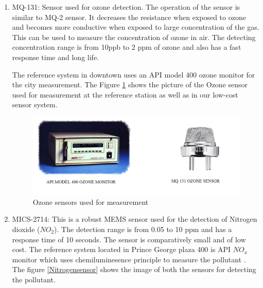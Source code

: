 \begin{enumerate}

\item MQ-131: Sensor used for ozone detection. The operation of the sensor is similar to MQ-2 sensor. It decreases the resistance when exposed to ozone and becomes more conductive when exposed to large concentration of the gas. This can be used to measure the concentration of ozone in air. The detecting concentration range is from 10ppb to 2 ppm of ozone and also has a fast response time and long life. 

The reference system in downtown uses an API model 400 ozone monitor for the city measurement\cite{Environment2010}. The Figure \ref{Ozonesensor} shows the picture of the Ozone sensor used for measurement at the reference station as well as in our low-cost sensor system.
  
\begin{figure}[h]
  \begin{center}
  \includegraphics[scale=0.70]{images/figure30.png}
  \end{center}
  \caption{Ozone sensors used for measurement \cite{Environment2010}}
  \label{Ozonesensor}
\end{figure}
\hspace{1 cm}

\item MICS-2714: This is a robust MEMS sensor used for the detection of Nitrogen dioxide ($NO_2$). The detection range is from 0.05 to 10 ppm and has a response time of 10 seconds. The sensor is comparatively small and of low cost. The reference system located in Prince George plaza 400 is API $NO_{x}$ monitor \cite{Environment2010} which uses chemiluminesence principle to measure the pollutant . The figure \ref{Nitrogensensor} shows the image of both the sensors for detecting the pollutant.
  

\end{enumerate}
